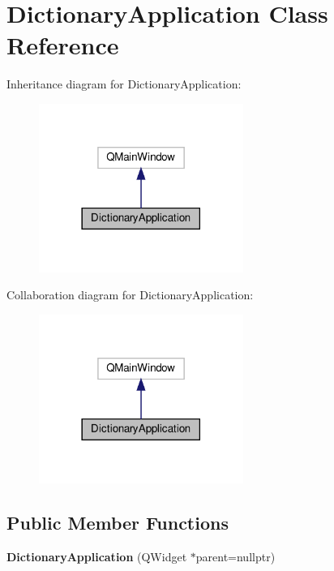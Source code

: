\hypertarget{classDictionaryApplication}{}\section{Dictionary\+Application Class Reference}
\label{classDictionaryApplication}


Inheritance diagram for Dictionary\+Application\+:\nopagebreak
\begin{figure}[H]
\begin{center}
\leavevmode
\includegraphics[width=189pt]{classDictionaryApplication__inherit__graph}
\end{center}
\end{figure}


Collaboration diagram for Dictionary\+Application\+:\nopagebreak
\begin{figure}[H]
\begin{center}
\leavevmode
\includegraphics[width=189pt]{classDictionaryApplication__coll__graph}
\end{center}
\end{figure}
\subsection*{Public Member Functions}
\begin{DoxyCompactItemize}
\item 
\mbox{\label{classDictionaryApplication_ab56d482375cffd58038600a718329b9b}} 
{\bfseries Dictionary\+Application} (Q\+Widget $\ast$parent=nullptr)
\end{DoxyCompactItemize}
